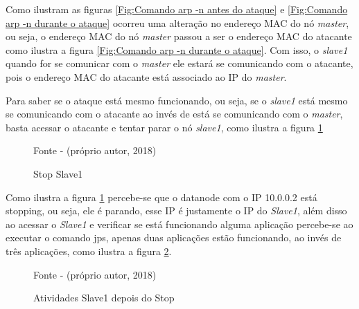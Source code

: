 Como ilustram as figuras \ref{Fig:Comando arp -n antes do ataque} e \ref{Fig:Comando arp -n durante o ataque} ocorreu uma alteração no endereço MAC do nó \textit{master}, ou seja, o endereço MAC do nó \textit{master} passou a ser o endereço MAC do atacante como ilustra a figura \ref{Fig:Comando arp -n durante o ataque}. Com isso, o \textit{slave1} quando for se comunicar com o \textit{master} ele estará se comunicando com o atacante, pois o endereço MAC do atacante está associado ao IP do \textit{master}.

Para saber se o ataque está mesmo funcionando, ou seja, se o \textit{slave1} está mesmo se comunicando com o atacante ao invés de está se comunicando com o \textit{master}, basta acessar o atacante e tentar parar o nó \textit{slave1}, como ilustra a figura \ref{Fig:Stop Slave1}


\begin{figure}[htbp!] \begin{center}
\caption{Stop Slave1}
\small{Fonte - (próprio autor, 2018)}
\label{Fig:Stop Slave1}
\end{center} \end{figure}

Como ilustra a figura \ref{Fig:Stop Slave1} percebe-se que o datanode com o IP 10.0.0.2 está stopping, ou seja, ele é parando, esse IP é justamente o IP do \textit{Slave1}, além disso ao acessar o \textit{Slave1} e verificar se está funcionando alguma aplicação percebe-se ao executar o comando jps, apenas duas aplicações estão funcionando, ao invés de três aplicações, como ilustra a figura \ref{Fig:Atividades Slave1 depois do Stop}.

\begin{figure}[htbp!] \begin{center}
\caption{Atividades Slave1 depois do Stop}
\small{Fonte - (próprio autor, 2018)}
\label{Fig:Atividades Slave1 depois do Stop}
\end{center} \end{figure}

